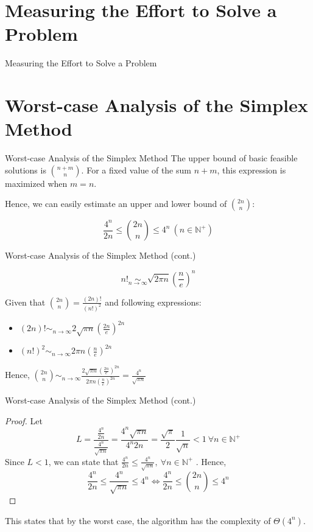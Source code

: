 \documentclass[10pt]{beamer}
\begin{document}
\section{Measuring the Effort to Solve a Problem}
\begin{frame}{Measuring the Effort to Solve a Problem}

\end{frame}

\section{Worst-case Analysis of the Simplex Method}
\begin{frame}{Worst-case Analysis of the Simplex Method}
The upper bound of basic feasible solutions is $\displaystyle {n + m \choose n}$. For a fixed value of the sum $n + m$, this expression is maximized when $m = n$.

Hence, we can easily estimate an upper and lower bound of $\displaystyle {2n \choose n}$:

$$
\frac{4^{n}}{2n} \leq {2n \choose n} \leq 4^{n} \ (n \in \mathbb{N^+})
$$
\end{frame}
\begin{frame}{Worst-case Analysis of the Simplex Method (cont.)}
\begin{theorem}
$$
\displaystyle
n! \operatorname*{\sim}_{n\to\infty} \sqrt{2\pi n}\left(\frac{n}{e}\right)^n
$$
\end{theorem}
Given that $\displaystyle {2n \choose n} = \frac{(2n)!}{(n!)^2}$ and following expressions:
\begin{itemize}
\item $\displaystyle (2n)! \operatorname*{\sim}_{n\to\infty} 2\sqrt{\pi n} \left(\frac{2n}{e}\right)^{2n}$ 
\item $\displaystyle (n!)^2 \operatorname*{\sim}_{n\to\infty} 2\pi n \left(\frac{n}{e}\right)^{2n}$ 
\end{itemize}
Hence, $\displaystyle {2n \choose n} \operatorname*{\sim}_{n\to\infty} \frac{2\sqrt{\pi n} \left(\frac{2n}{e}\right)^{2n}}{2\pi n \left(\frac{n}{e}\right)^{2n}} =  \frac{4^n}{\sqrt{\pi n}}$
\end{frame}

\begin{frame}{Worst-case Analysis of the Simplex Method (cont.)}
\begin{proof}
Let
$$
\displaystyle
L = \frac{\frac{4^n}{2n}}{\frac{4^n}{\sqrt{\pi n}}} = \frac{4^n\sqrt{\pi n}}{4^n 2n} = \frac{\sqrt{\pi}}{2} \frac{1}{\sqrt{n}} < 1\ \forall n \in \mathbb{N^+}
$$
Since $L < 1$, we can state that $\frac{4^n}{2n} \leq \frac{4^n}{\sqrt{\pi n}},\ \forall n \in \mathbb{N^+}
$
. Hence,
$$
\displaystyle
\frac{4^n}{2n} \leq \frac{4^n}{\sqrt{\pi n}} \leq 4^n \iff \frac{4^n}{2n} \leq {2n \choose n} \leq 4^n
$$
\end{proof}
This states that by the worst case, the algorithm has the complexity of $\Theta(4^n)$.
\end{frame}
\end{document}
